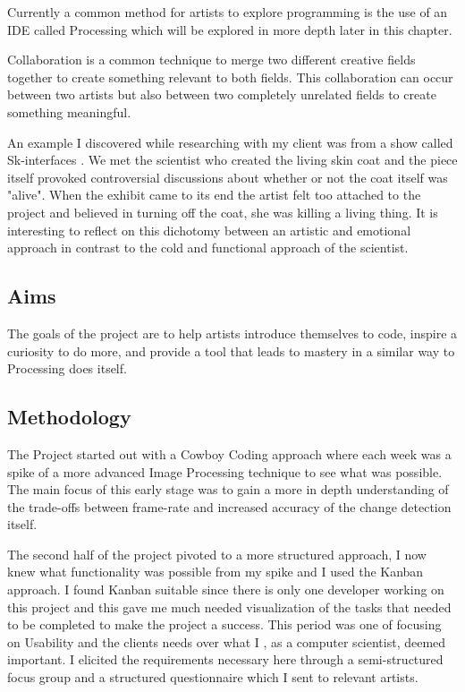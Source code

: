 \documentclass[a4paper]{report}
\begin{document}
Currently a common method for artists to explore programming is the use of an IDE called Processing which will be explored in more depth later in this chapter.

Collaboration is a common technique to merge two different creative fields together to create something relevant to both fields. This collaboration can occur between two artists but also between two completely unrelated fields to create something meaningful. 

An example I discovered while researching with my client was from a show called Sk-interfaces \cite{SKIN}. We met the scientist who created the living skin coat and the piece itself provoked controversial discussions about whether or not the coat itself was "alive". When the exhibit came to its end the artist felt too attached to the project and believed in turning off the coat, she was killing a living thing. It is interesting to reflect on this dichotomy between an artistic and emotional approach in contrast to the cold and functional approach of the scientist.

\subsection{Aims}
The goals of the project are to help artists introduce themselves to code, inspire a curiosity to do more, and provide a tool that leads to mastery in a similar way to Processing\cite{PROCESSING} does itself.

\subsection{Methodology}
The Project started out with a Cowboy Coding approach where each week was a spike of a more advanced Image Processing technique to see what was possible. The main focus of this early stage was to gain a more in depth understanding of the trade-offs between frame-rate and increased accuracy of the change detection itself.

The second half of the project pivoted to a more structured approach, I now knew what functionality was possible from my spike and I used the Kanban\cite{KANBAN} approach.  I found Kanban suitable since there is only one developer working on this project and this gave me much needed visualization of the tasks that needed to be completed to make the project a success. This period was one of focusing on Usability and the clients needs over what I , as a computer scientist, deemed important. I elicited the requirements necessary here through a semi-structured focus group and a structured questionnaire which I sent to relevant artists.
\end{document}
